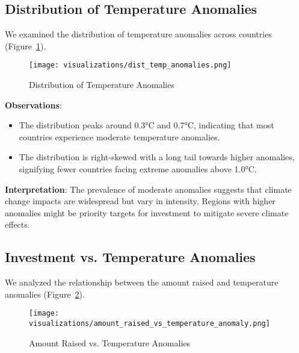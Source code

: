 \documentclass[sigconf]{acmart}
\begin{document}
\subsection{Distribution of Temperature Anomalies}

We examined the distribution of temperature anomalies across countries (Figure~\ref{fig:temp_anomalies}).

\begin{figure}[htpb]
    \centering
    \texttt{[image: visualizations/dist\_temp\_anomalies.png]}
    \caption{Distribution of Temperature Anomalies}
    \label{fig:temp_anomalies}
\end{figure}

\textbf{Observations}:

\begin{itemize}
    \item The distribution peaks around 0.3°C and 0.7°C, indicating that most countries experience moderate temperature anomalies.
    \item The distribution is right-skewed with a long tail towards higher anomalies, signifying fewer countries facing extreme anomalies above 1.0°C.
\end{itemize}

\textbf{Interpretation}: The prevalence of moderate anomalies suggests that climate change impacts are widespread but vary in intensity. Regions with higher anomalies might be priority targets for investment to mitigate severe climate effects.

\subsection{Investment vs. Temperature Anomalies}

We analyzed the relationship between the amount raised and temperature anomalies (Figure~\ref{fig:amount_vs_temp}).

\begin{figure}[htpb]
    \centering
    \texttt{[image: visualizations/amount\_raised\_vs\_temperature\_anomaly.png]}
    \caption{Amount Raised vs. Temperature Anomalies}
    \label{fig:amount_vs_temp}
\end{figure}
\end{document}
